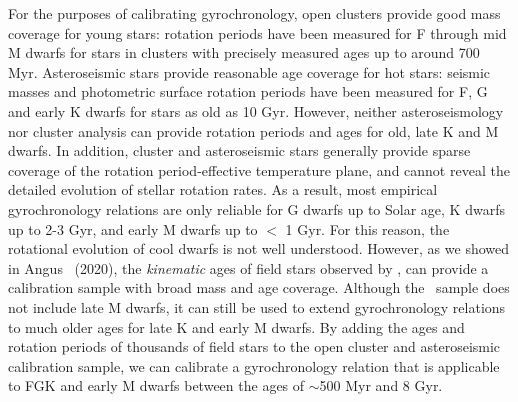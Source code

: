 For the purposes of calibrating gyrochronology, open clusters provide good
mass coverage for young stars: rotation periods have been measured for F
through mid M dwarfs for stars in clusters with precisely measured ages up to
around 700 Myr.
Asteroseismic stars provide reasonable age coverage for hot stars: seismic
masses and photometric surface rotation periods have been measured for F, G
and early K dwarfs for stars as old as 10 Gyr.
However, neither asteroseismology nor cluster analysis can provide rotation
periods and ages for old, late K and M dwarfs.
In addition, cluster and asteroseismic stars generally provide sparse coverage
of the rotation period-effective temperature plane, and cannot reveal the
detailed evolution of stellar rotation rates.
As a result, most empirical gyrochronology relations are only reliable for G
dwarfs up to Solar age, K dwarfs up to 2-3 Gyr, and early M dwarfs up to $<$ 1
Gyr.
For this reason, the rotational evolution of cool dwarfs is not well
understood.
However, as we showed in Angus \etal\ (2020), the {\it kinematic} ages of
field stars observed by \kepler, can provide a calibration sample with broad
mass and age coverage.
Although the \kepler\ sample does not include late M dwarfs, it can still be
used to extend gyrochronology relations to much older ages for late K and
early M dwarfs.
By adding the ages and rotation periods of thousands of field stars to the
open cluster and asteroseismic calibration sample, we can calibrate a
gyrochronology relation that is applicable to FGK and early M dwarfs between
the ages of $\sim$500 Myr and 8 Gyr.


